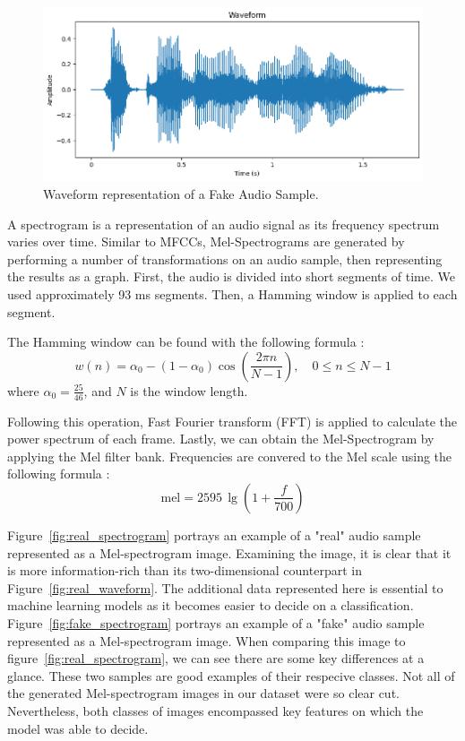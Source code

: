 \documentclass[conference]{IEEEtran}
\begin{document}
\begin{figure}
  \centering
  \includegraphics[width=\linewidth]{images/fake_waveform.png}
  \caption{Waveform representation of a Fake Audio Sample.}
  \label{fig:fake_waveform}
\end{figure}

A spectrogram is a representation of an audio signal as its frequency spectrum varies over time. Similar to MFCCs, Mel-Spectrograms are generated by performing a number of transformations on an audio sample, then representing the results as a graph. First, the audio is divided into short segments of time. We used approximately 93 ms segments. Then, a Hamming window is applied to each segment.

The Hamming window can be found with the following formula \cite{9252126}:
\begin{equation}
w(n) = \alpha_0 - (1 - \alpha_0) \cos\left(\frac{2\pi n}{N-1}\right), \quad 0 \leq n \leq N-1
\end{equation}
where \(\alpha_0 = \frac{25}{46}\), and \(N\) is the window length.

Following this operation, Fast Fourier transform (FFT) is applied to calculate the power spectrum of each frame. Lastly, we can obtain the Mel-Spectrogram by applying the Mel filter bank. Frequencies are convered to the Mel scale using the following formula \cite{9252126}:
\begin{equation}
\text{mel} = 2595 \, \lg\left(1 + \frac{f}{700}\right)
\end{equation}

Figure~\ref{fig:real_spectrogram} portrays an example of a "real" audio sample represented as a Mel-spectrogram image. Examining the image, it is clear that it is more information-rich than its two-dimensional counterpart in Figure~\ref{fig:real_waveform}. The additional data represented here is essential to machine learning models as it becomes easier to decide on a classification. Figure~\ref{fig:fake_spectrogram} portrays an example of a "fake" audio sample represented as a Mel-spectrogram image. When comparing this image to figure~\ref{fig:real_spectrogram}, we can see there are some key differences at a glance. These two samples are good examples of their respecive classes. Not all of the generated Mel-spectrogram images in our dataset were so clear cut. Nevertheless, both classes of images encompassed key features on which the model was able to decide. 
\end{document}
